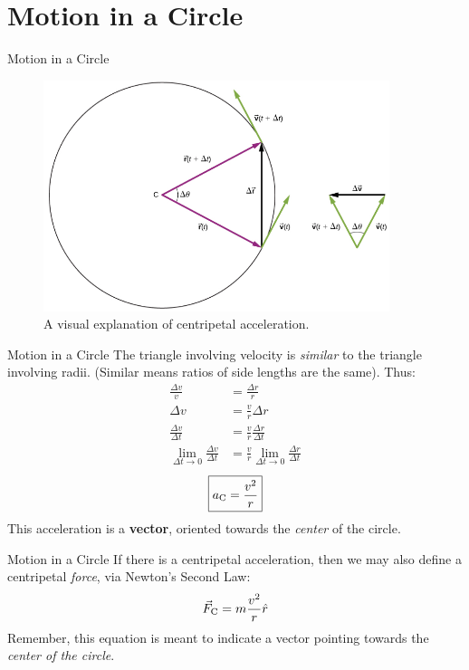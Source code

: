 \documentclass{beamer}
\begin{document}
\section{Motion in a Circle}

\begin{frame}{Motion in a Circle}
\begin{figure}
\centering
\includegraphics[width=0.9\textwidth]{figures/circle.png}
\caption{\label{fig:circle} A visual explanation of centripetal acceleration.}
\end{figure}
\end{frame}

\begin{frame}{Motion in a Circle}
\small
The triangle involving velocity is \textit{similar} to the triangle involving radii.  (Similar means ratios of side lengths are the same).  Thus:
\begin{align}
\frac{\Delta v}{v} &= \frac{\Delta r}{r} \\
\Delta v &= \frac{v}{r}\Delta r \\
\frac{\Delta v}{\Delta t} &= \frac{v}{r}\frac{\Delta r}{\Delta t} \\
\lim_{\Delta t \to 0} \frac{\Delta v}{\Delta t} &= \frac{v}{r} \lim_{\Delta t \to 0} \frac{\Delta r}{\Delta t}
\end{align}
\begin{equation}
\boxed{a_{\rm C} = \frac{v^2}{r}}
\end{equation}
This acceleration is a \textbf{vector}, oriented towards the \textit{center} of the circle.
\end{frame}

\begin{frame}{Motion in a Circle}
If there is a centripetal acceleration, then we may also define a centripetal \textit{force}, via Newton's Second Law:
\begin{equation}
\vec{F}_{\rm C} = m \frac{v^2}{r} \hat{r}
\end{equation}
Remember, this equation is meant to indicate a vector pointing towards the \textit{center of the circle}.
\end{frame}
\end{document}
